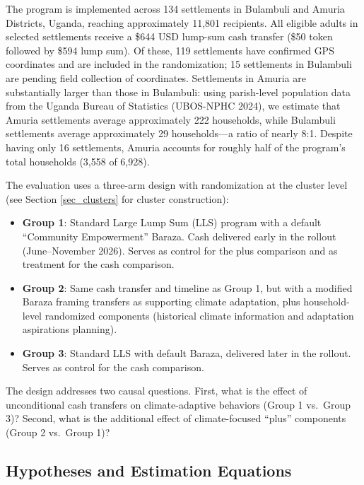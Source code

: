 \documentclass[12pt, oneside]{amsart}
\numberwithin{equation}{section}
\begin{document}
The program is implemented across 134 settlements in Bulambuli and Amuria Districts, Uganda, reaching approximately 11,801 recipients. All eligible adults in selected settlements receive a \$644 USD lump-sum cash transfer (\$50 token followed by \$594 lump sum). Of these, 119 settlements have confirmed GPS coordinates and are included in the randomization; 15 settlements in Bulambuli are pending field collection of coordinates. Settlements in Amuria are substantially larger than those in Bulambuli: using parish-level population data from the Uganda Bureau of Statistics (UBOS-NPHC 2024), we estimate that Amuria settlements average approximately 222 households, while Bulambuli settlements average approximately 29 households---a ratio of nearly 8:1. Despite having only 16 settlements, Amuria accounts for roughly half of the program's total households (3,558 of 6,928).

The evaluation uses a three-arm design with randomization at the cluster level (see Section \ref{sec_clusters} for cluster construction):

\begin{itemize}
    \item \textbf{Group 1}: Standard Large Lump Sum (LLS) program with a default ``Community Empowerment'' Baraza. Cash delivered early in the rollout (June--November 2026). Serves as control for the plus comparison and as treatment for the cash comparison.
    \item \textbf{Group 2}: Same cash transfer and timeline as Group 1, but with a modified Baraza framing transfers as supporting climate adaptation, plus household-level randomized components (historical climate information and adaptation aspirations planning).
    \item \textbf{Group 3}: Standard LLS with default Baraza, delivered later in the rollout. Serves as control for the cash comparison.
\end{itemize}

The design addresses two causal questions. First, what is the effect of unconditional cash transfers on climate-adaptive behaviors (Group 1 vs.\ Group 3)? Second, what is the additional effect of climate-focused ``plus'' components (Group 2 vs.\ Group 1)?

\subsection{\label{sec_hypotheses}Hypotheses and Estimation Equations}
\end{document}
